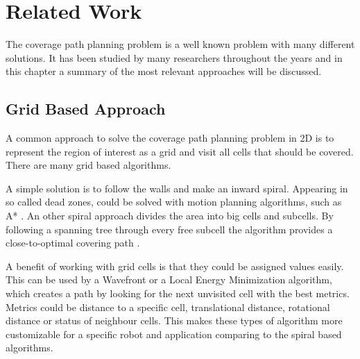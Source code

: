 
\chapter{Related Work}
\label{cha:related_work}

The coverage path planning problem is a well known problem with many different solutions. It has been studied by many researchers throughout the years and in this chapter a summary of the most relevant approaches will be discussed.

\section{Grid Based Approach}
A common approach to solve the coverage path planning problem in 2D is to represent the region of interest as a grid and visit all cells that should be covered. There are many grid based algorithms. 

A simple solution is to follow the walls and make an inward spiral. Appearing in so called dead zones, could be solved with motion planning algorithms, such as A* \cite{inwardsspiral}. An other spiral approach divides the area into big cells and subcells. By following a spanning tree through every free subcell the algorithm provides a close-to-optimal covering path \cite{1013479}. 

A benefit of working with grid cells is that they could be assigned values easily. This can be used by a Wavefront \cite{Zelinsky2007PlanningPO} or a Local Energy Minimization \cite{7139818} algorithm, which creates a path by looking for the next unvisited cell with the best metrics. Metrics could be distance to a specific cell, translational distance, rotational distance or status of neighbour cells. This makes these types of algorithm more customizable for a specific robot and application comparing to the spiral based algorithms.

